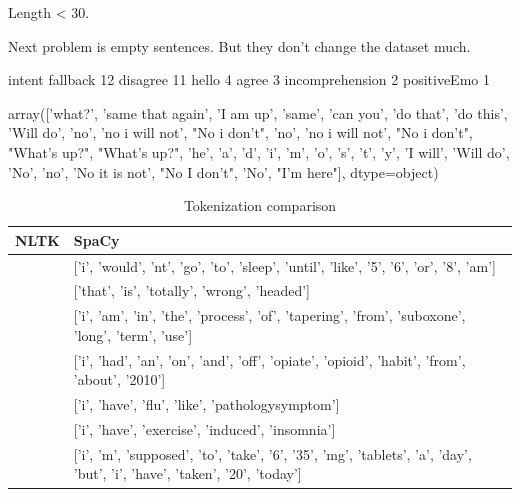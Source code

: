 \documentclass[11pt]{article}
\begin{document}
Length < 30.


Next problem is empty sentences. But they don't change the dataset much.

intent
fallback           12
disagree           11
hello               4
agree               3
incomprehension     2
positiveEmo         1

array(['what?', 'same that again', 'I am up', 'same', 'can you',
       'do that', 'do this', 'Will do', 'no', 'no i will not',
       "No i don't", 'no', 'no i will not', "No i don't", "What's up?",
       "What's up?", 'he', 'a', 'd', 'i', 'm', 'o', 's', 't', 'y',
       'I will', 'Will do', 'No', 'no', 'No it is not', "No I don't",
       'No', "I'm here"], dtype=object)

\begin{center}
\begin{table}
\begin{tabular}{ |p{7cm}|p{7cm}| }
\hline
NLTK & SpaCy \\ \hline
['i', 'wouldnt', 'go', 'to', 'sleep', 'until', 'like', '5', '6', 'or', '8am'] & 
['i', 'would', 'nt', 'go', 'to', 'sleep', 'until', 'like', '5', '6', 'or', '8', 'am'] \\ \hline
['that', 'is', 'totally', 'wrongheaded'] & ['that', 'is', 'totally', 'wrong', 'headed'] \\ \hline
['i', 'am', 'in', 'the', 'process', 'of', 'tapering', 'from', 'suboxone', 'longterm', 'use'] & 
['i', 'am', 'in', 'the', 'process', 'of', 'tapering', 'from', 'suboxone', 'long', 'term', 'use'] \\ \hline
['i', 'had', 'an', 'onandoff', 'opiateopioid', 'habit', 'from', 'about', '2010'] & 
['i', 'had', 'an', 'on', 'and', 'off', 'opiate', 'opioid', 'habit', 'from', 'about', '2010'] \\ 
\hline
['i', 'have', 'flulike', 'pathologysymptom'] & ['i', 'have', 'flu', 'like', 'pathologysymptom'] \\ \hline
['i', 'have', 'exerciseinduced', 'insomnia'] & ['i', 'have', 'exercise', 'induced', 'insomnia'] \\ \hline
['i', 'm', 'supposed', 'to', 'take', '6', '35mg', 'tablets', 'a', 'day', 'but', 'i', 'have', 'taken', '20', 'today'] & 
['i', 'm', 'supposed', 'to', 'take', '6', '35', 'mg', 'tablets', 'a', 'day', 'but', 'i', 'have', 'taken', '20', 'today'] \\ 
\hline
\end{tabular}	
\caption{\label{token_dif}Tokenization comparison}
\end{table}
\end{center}
\FloatBarrier
\end{document}
